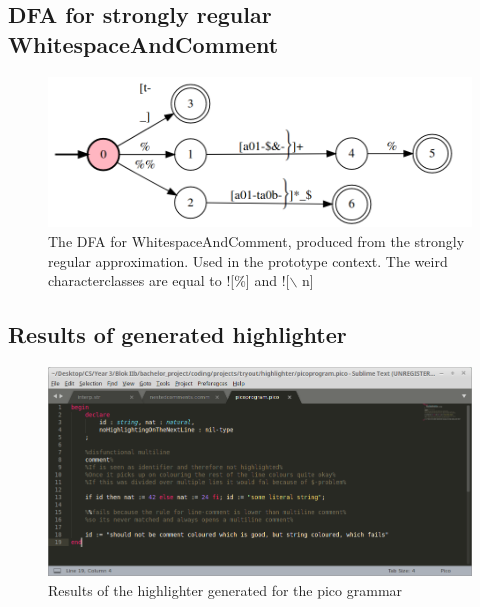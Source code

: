 \subsection{DFA for strongly regular WhitespaceAndComment}
\begin{figure}[h!]
	\centering
	\includegraphics[width=\textwidth, keepaspectratio]{Figures/pico_dfa_whitespaceandcomment.png}
	\decoRule
 	\caption[DFA of WhitespaceAndComment]{The DFA for WhitespaceAndComment, produced from the strongly regular approximation. Used in the prototype context. The weird characterclasses are equal to ![\%] and ![$\backslash$ n]}
 	\label{fig:pico:DFA:WhitespaceAndComment}
\end{figure}


\pagebreak\subsection{Results of generated highlighter}
\begin{figure}[h]
	\centering
	\includegraphics[width=\textwidth, keepaspectratio]{Figures/highlightShots/pico_generated.png}
	\decoRule
 	\caption[Generated highlighter results for Pico grammar]{Results of the highlighter generated for the pico grammar}
 	\label{fig:pico:highlighter:generated}
\end{figure}

